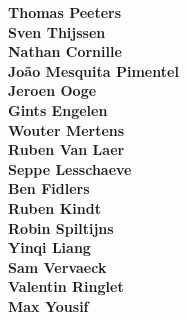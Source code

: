 \begin{multicols}{2}
\textbf{Thomas Peeters}\\
\textbf{Sven Thijssen}\\
\textbf{Nathan Cornille}\\
\textbf{Jo\~{a}o Mesquita Pimentel}\\
\textbf{Jeroen Ooge}\\
\textbf{Gints Engelen}\\
\textbf{Wouter Mertens}\\
\textbf{Ruben Van Laer}\\
\textbf{Seppe Lesschaeve}\\
\textbf{Ben Fidlers}\\
\textbf{Ruben Kindt}\\
\textbf{Robin Spiltijns}\\
\textbf{Yinqi Liang}\\
\textbf{Sam Vervaeck}\\
\textbf{Valentin Ringlet}\\
\textbf{Max Yousif}\\
\end{multicols}
